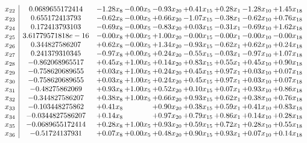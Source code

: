 \documentclass[8pt]{article}
\begin{document}
\[\begin{array}{c| c c@{\hskip 2pt} c@{\hskip 2pt} c@{\hskip 2pt} c@{\hskip 2pt} c@{\hskip 2pt} c@{\hskip 2pt} c@{\hskip 2pt} }
 x_{22}   &  0.0689655172414 & -1.28 x_{8} & -0.00 x_{5} & -0.93 x_{20} & +  0.41 x_{15} & +  0.28 x_{1} & -1.28 x_{10} & +  1.45 x_{18}\\
 x_{23}   &  0.655172413793 & -0.62 x_{8} & -0.00 x_{5} & +  0.66 x_{20} & -1.07 x_{15} & -0.38 x_{1} & -0.62 x_{10} & +  0.76 x_{18}\\
 x_{24}   &  0.172413793103 & -0.69 x_{8} & -0.00 x_{5} & -0.83 x_{20} & +  0.03 x_{15} & -0.31 x_{1} & -0.69 x_{10} & +  1.62 x_{18}\\
 x_{25}   &  3.61779571818e-16 & -0.00 x_{8} & +  0.00 x_{5} & +  1.00 x_{20} & -0.00 x_{15} & -0.00 x_{1} & -0.00 x_{10} & -0.00 x_{18}\\
 x_{26}   &  0.344827586207 & +  0.62 x_{8} & -0.00 x_{5} & +  1.34 x_{20} & -0.93 x_{15} & -0.62 x_{1} & +  0.62 x_{10} & +  0.24 x_{18}\\
 x_{27}   &  0.241379310345 & -0.97 x_{8} & +  0.00 x_{5} & +  0.24 x_{20} & -0.55 x_{15} & -0.03 x_{1} & -0.97 x_{10} & +  1.07 x_{18}\\
 x_{28}   &  -0.862068965517 & +  0.45 x_{8} & +  1.00 x_{5} & +  0.14 x_{20} & +  0.83 x_{15} & +  0.55 x_{1} & +  0.45 x_{10} & +  0.90 x_{18}\\
 x_{29}   &  -0.758620689655 & +  0.03 x_{8} & +  1.00 x_{5} & +  0.24 x_{20} & +  0.45 x_{15} & +  0.97 x_{1} & +  0.03 x_{10} & +  0.07 x_{18}\\
 x_{30}   &  -0.758620689655 & +  0.03 x_{8} & +  1.00 x_{5} & +  0.24 x_{20} & +  0.45 x_{15} & +  0.97 x_{1} & +  0.03 x_{10} & +  0.07 x_{18}\\
 x_{31}   &  -0.48275862069 & +  0.93 x_{8} & +  1.00 x_{5} & +  0.52 x_{20} & +  0.10 x_{15} & +  0.07 x_{1} & +  0.93 x_{10} & +  0.86 x_{18}\\
 x_{32}   &  -0.344827586207 & +  0.38 x_{8} & +  1.00 x_{5} & +  0.66 x_{20} & +  0.93 x_{15} & +  0.62 x_{1} & +  0.38 x_{10} & +  0.76 x_{18}\\
 x_{33}   &  -0.103448275862 & +  0.41 x_{8} &   & +  0.90 x_{20} & +  0.38 x_{15} & +  0.59 x_{1} & +  0.41 x_{10} & +  0.83 x_{18}\\
 x_{34}   &  -0.0344827586207 & +  0.14 x_{8} &   & +  0.97 x_{20} & +  0.79 x_{15} & +  0.86 x_{1} & +  0.14 x_{10} & +  0.28 x_{18}\\
 x_{35}   &  -0.0689655172414 & +  0.28 x_{8} & +  1.00 x_{5} & +  0.93 x_{20} & +  0.59 x_{15} & +  0.72 x_{1} & +  0.28 x_{10} & +  0.55 x_{18}\\
 x_{36}   &  -0.51724137931 & +  0.07 x_{8} & +  0.00 x_{5} & +  0.48 x_{20} & +  0.90 x_{15} & +  0.93 x_{1} & +  0.07 x_{10} & +  0.14 x_{18}\\

\end{array}\]
\end{document}
